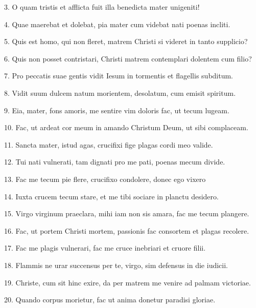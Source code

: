 \documentclass[parskip=full]{scrreprt}
\newif\iftemplate\templatetrue
\begin{document}
3.
O quam tristis et afflicta
fuit illa benedicta
mater unigeniti!

4.
Quae maerebat et dolebat,
pia mater cum videbat
nati poenas incliti.

5.
Quis est homo, qui non fleret,
matrem Christi si videret
in tanto supplicio?

6.
Quis non posset contristari,
Christi matrem contemplari
dolentem cum filio?

7.
Pro peccatis suae gentis
vidit Iesum in tormentis
et flagellis subditum.

8.
Vidit suum dulcem natum
morientem, desolatum,
cum emisit spiritum.

9.
Eia, mater, fons amoris,
me sentire vim doloris
fac, ut tecum lugeam.

10.
Fac, ut ardeat cor meum
in amando Christum Deum,
ut sibi complaceam.

11.
Sancta mater, istud agas,
crucifixi fige plagas
cordi meo valide.

12.
Tui nati vulnerati,
tam dignati pro me pati,
poenas mecum divide.

13.
Fac me tecum pie flere,
crucifixo condolere,
donec ego vixero

14.
Iuxta crucem tecum stare,
et me tibi sociare
in planctu desidero.

15.
Virgo virginum praeclara,
mihi iam non sis amara,
fac me tecum plangere.

16.
Fac, ut portem Christi mortem,
passionis fac consortem
et plagas recolere.

17.
Fac me plagis vulnerari,
fac me cruce inebriari
et cruore filii.

18.
Flammis ne urar succensus
per te, virgo, sim defensus
in die iudicii.

19.
Christe, cum sit hinc exire,
da per matrem me venire
ad palmam victoriae.

20.
Quando corpus morietur,
fac ut anima donetur
paradisi gloriae.

\cleardoublepage
\fi

\iftemplate

\fi
\end{document}
